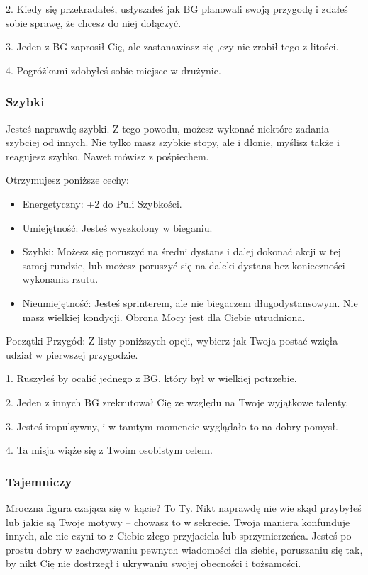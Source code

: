 2. Kiedy się przekradałeś, usłyszałeś jak BG planowali swoją przygodę i zdałeś sobie sprawę, że chcesz do niej dołączyć.

3. Jeden z BG zaprosił Cię, ale zastanawiasz się ,czy nie zrobił tego z litości.

4. Pogróżkami zdobyłeś sobie miejsce w drużynie.

\subsubsection{Szybki}

Jesteś naprawdę szybki. Z tego powodu, możesz wykonać niektóre zadania szybciej od innych. Nie tylko masz szybkie stopy, ale i dłonie, myślisz także i reagujesz szybko. Nawet mówisz z pośpiechem. 

Otrzymujesz poniższe cechy:
\begin{itemize}
    \item  Energetyczny: +2 do Puli Szybkości.
    \item  Umiejętność: Jesteś wyszkolony w bieganiu.
    \item  Szybki: Możesz się poruszyć na średni dystans i dalej dokonać akcji w tej samej rundzie, lub możesz poruszyć się na daleki dystans bez konieczności wykonania rzutu.
    \item  Nieumiejętność: Jesteś sprinterem, ale nie biegaczem długodystansowym. Nie masz wielkiej kondycji. Obrona Mocy jest dla Ciebie utrudniona.
\end{itemize}

Początki Przygód: Z listy poniższych opcji, wybierz jak Twoja postać wzięła udział w pierwszej przygodzie.

1. Ruszyłeś by ocalić jednego z BG, który był w wielkiej potrzebie.

2. Jeden z innych BG zrekrutował Cię ze względu na Twoje wyjątkowe talenty.

3. Jesteś impulsywny, i w tamtym momencie wyglądało to na dobry pomysł.

4. Ta misja wiąże się z Twoim osobistym celem.

\subsubsection{Tajemniczy}

Mroczna figura czająca się w kącie? To Ty. Nikt naprawdę nie wie skąd przybyłeś lub jakie są Twoje motywy – chowasz to w sekrecie. Twoja maniera konfunduje innych, ale nie czyni to z Ciebie złego przyjaciela lub sprzymierzeńca. Jesteś po prostu dobry w zachowywaniu pewnych wiadomości dla siebie, poruszaniu się tak, by nikt Cię nie dostrzegł i ukrywaniu swojej obecności i tożsamości.

